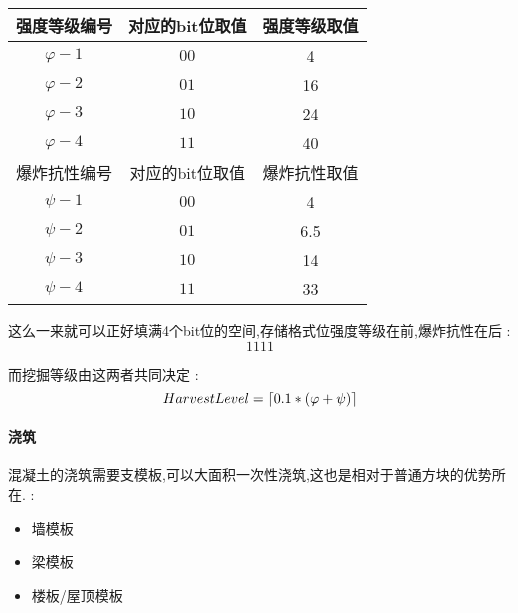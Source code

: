 {{{{              \begin{center}
                  \begin{tabular}{|c|c|c|}
                      \hline
                      强度等级编号 & 对应的bit位取值 & 强度等级取值 \\
                      \hline
                      $\varphi-1$  & $00$            & 4            \\
                      \hline
                      $\varphi-2$  & $01$            & 16           \\
                      \hline
                      $\varphi-3$  & $10$            & 24           \\
                      \hline
                      $\varphi-4$  & $11$            & 40           \\
                      \hline
                      爆炸抗性编号 & 对应的bit位取值 & 爆炸抗性取值 \\
                      \hline
                      $\psi-1$     & $00$            & 4            \\
                      \hline
                      $\psi-2$     & $01$            & 6.5          \\
                      \hline
                      $\psi-3$     & $10$            & 14           \\
                      \hline
                      $\psi-4$     & $11$            & 33           \\
                      \hline
                  \end{tabular}
              \end{center}

              这么一来就可以正好填满4个bit位的空间,存储格式位强度等级在前,爆炸抗性在后 : $$
                  \boxed{11}\boxed{11}
              $$

              而挖掘等级由这两者共同决定 : $$
                  HarvestLevel = \left\lceil 0.1*(\varphi + \psi) \right\rceil
              $$
          }

          \paragraph{浇筑}{
              混凝土的浇筑需要支模板,可以大面积一次性浇筑,这也是相对于普通方块的优势所在. :
              \begin{itemize}[itemsep=1pt]
                  \item 墙模板
                  \item 梁模板
                  \item 楼板/屋顶模板
              \end{itemize}

}}}}
